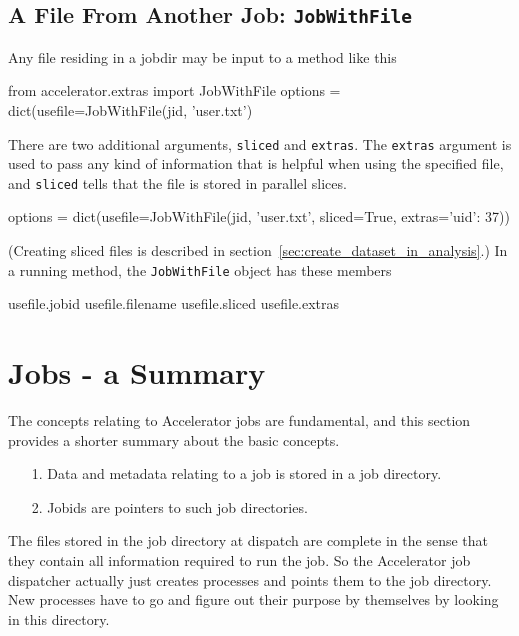 \subsection{A File From Another Job:  \texttt{JobWithFile}}
\label{sec:jobwithfile}

Any file residing in a jobdir may be input to a method like this
\begin{python}
from accelerator.extras import JobWithFile
options = dict(usefile=JobWithFile(jid, 'user.txt')
\end{python}
There are two additional arguments, \texttt{sliced} and
\texttt{extras}.  The \texttt{extras} argument is used to pass any
kind of information that is helpful when using the specified file, and
\texttt{sliced} tells that the file is stored in parallel slices.
\begin{python}
options = dict(usefile=JobWithFile(jid, 'user.txt', sliced=True, extras={'uid': 37}))
\end{python}
(Creating sliced files is described in section~\ref{sec:create_dataset_in_analysis}.)  In a
running method, the \texttt{JobWithFile} object has these members
\begin{python}
usefile.jobid
usefile.filename
usefile.sliced
usefile.extras
\end{python}





\section{Jobs - a Summary}
The concepts relating to Accelerator jobs are fundamental, and this
section provides a shorter summary about the basic concepts.

\begin{itemize}
\item[1.]  Data and metadata relating to a job is stored in a
job directory.
\item[2.]  Jobids are pointers to such job directories.
\end{itemize}
The files stored in the job directory at dispatch are complete in the
sense that they contain all information required to run the job.  So
the Accelerator job dispatcher actually just creates processes and
points them to the job directory.  New processes have to go and figure
out their purpose by themselves by looking in this directory.


